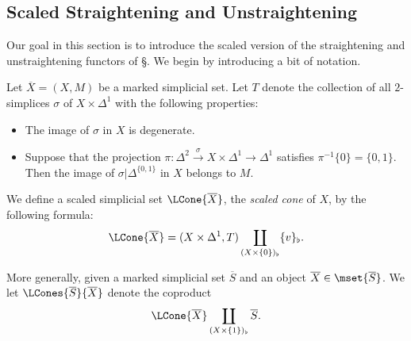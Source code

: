 
\subsection{Scaled Straightening and Unstraightening}\label{bisec3.3}

Our goal in this section is to introduce the scaled version of the straightening
and unstraightening functors of \S {}. We begin by introducing a bit of notation.

\begin{definition}\label{sputer1}
Let $\overline{X} = (X, M)$ be a marked simplicial set. Let $T$ denote the collection of all
$2$-simplices $\sigma$ of $X \times \Delta^1$ with the following properties:
\begin{itemize}
\item[$(a)$] The image of $\sigma$ in $X$ is degenerate.
\item[$(b)$] Suppose that the projection $\pi: \Delta^2 \stackrel{\sigma}{\rightarrow} X \times \Delta^1 \rightarrow \Delta^1$ satisfies $\pi^{-1} \{0\} = \{0,1\}$. Then the image of $\sigma | \Delta^{ \{0,1\} }$
in $X$ belongs to $M$.
\end{itemize}
We define a scaled simplicial set
$\LCone{\overline{X}}$, the {\it scaled cone} of $X$, by the following formula:
$$\LCone{\overline{X}} = (X \times \Delta^1, T) \coprod_{ (X \times \{0\})_{\flat} } \{v\}_{\flat}.$$

More generally, given a marked simplicial set $\overline{S}$ and an object $\overline{X} \in 
\mset{\overline{S}}$. We let $\LCones{\overline{S}}{\overline{X}}$ denote the coproduct
$$ \LCone{ \overline{X} } \coprod_{ (X \times \{1\})_{\flat} } \overline{S}.$$
\end{definition}

